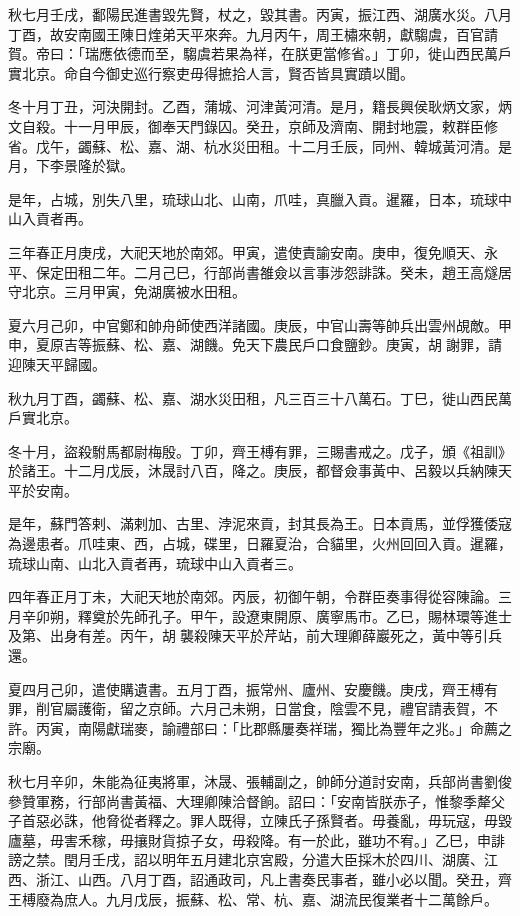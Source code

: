 \begin{pinyinscope}
秋七月壬戌，鄱陽民進書毀先賢，杖之，毀其書。丙寅，振江西、湖廣水災。八月丁酉，故安南國王陳日煃弟天平來奔。九月丙午，周王橚來朝，獻騶虞，百官請賀。帝曰：「瑞應依德而至，騶虞若果為祥，在朕更當修省。」丁卯，徙山西民萬戶實北京。命自今御史巡行察吏毋得摭拾人言，賢否皆具實蹟以聞。

冬十月丁丑，河決開封。乙酉，蒲城、河津黃河清。是月，籍長興侯耿炳文家，炳文自殺。十一月甲辰，御奉天門錄囚。癸丑，京師及濟南、開封地震，敕群臣修省。戊午，蠲蘇、松、嘉、湖、杭水災田租。十二月壬辰，同州、韓城黃河清。是月，下李景隆於獄。

是年，占城，別失八里，琉球山北、山南，爪哇，真臘入貢。暹羅，日本，琉球中山入貢者再。

三年春正月庚戌，大祀天地於南郊。甲寅，遣使責諭安南。庚申，復免順天、永平、保定田租二年。二月己巳，行部尚書雒僉以言事涉怨誹誅。癸未，趙王高燧居守北京。三月甲寅，免湖廣被水田租。

夏六月己卯，中官鄭和帥舟師使西洋諸國。庚辰，中官山壽等帥兵出雲州覘敵。甲申，夏原吉等振蘇、松、嘉、湖饑。免天下農民戶口食鹽鈔。庚寅，胡𡗨謝罪，請迎陳天平歸國。

秋九月丁酉，蠲蘇、松、嘉、湖水災田租，凡三百三十八萬石。丁巳，徙山西民萬戶實北京。

冬十月，盜殺駙馬都尉梅殷。丁卯，齊王榑有罪，三賜書戒之。戊子，頒《祖訓》於諸王。十二月戊辰，沐晟討八百，降之。庚辰，都督僉事黃中、呂毅以兵納陳天平於安南。

是年，蘇門答剌、滿剌加、古里、浡泥來貢，封其長為王。日本貢馬，並俘獲倭寇為邊患者。爪哇東、西，占城，碟里，日羅夏治，合貓里，火州回回入貢。暹羅，琉球山南、山北入貢者再，琉球中山入貢者三。

四年春正月丁未，大祀天地於南郊。丙辰，初御午朝，令群臣奏事得從容陳論。三月辛卯朔，釋奠於先師孔子。甲午，設遼東開原、廣寧馬市。乙巳，賜林環等進士及第、出身有差。丙午，胡𡗨襲殺陳天平於芹站，前大理卿薛巖死之，黃中等引兵還。

夏四月己卯，遣使購遺書。五月丁酉，振常州、廬州、安慶饑。庚戌，齊王榑有罪，削官屬護衛，留之京師。六月己未朔，日當食，陰雲不見，禮官請表賀，不許。丙寅，南陽獻瑞麥，諭禮部曰：「比郡縣屢奏祥瑞，獨比為豐年之兆。」命薦之宗廟。

秋七月辛卯，朱能為征夷將軍，沐晟、張輔副之，帥師分道討安南，兵部尚書劉俊參贊軍務，行部尚書黃福、大理卿陳洽督餉。詔曰：「安南皆朕赤子，惟黎季犛父子首惡必誅，他脅從者釋之。罪人既得，立陳氏子孫賢者。毋養亂，毋玩寇，毋毀廬墓，毋害禾稼，毋攘財貨掠子女，毋殺降。有一於此，雖功不宥。」乙巳，申誹謗之禁。閏月壬戌，詔以明年五月建北京宮殿，分遣大臣採木於四川、湖廣、江西、浙江、山西。八月丁酉，詔通政司，凡上書奏民事者，雖小必以聞。癸丑，齊王榑廢為庶人。九月戊辰，振蘇、松、常、杭、嘉、湖流民復業者十二萬餘戶。


\end{pinyinscope}
